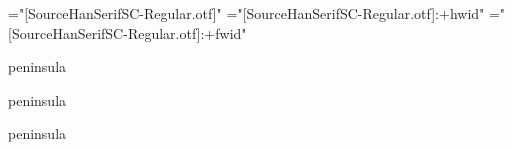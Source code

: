 \font\fa="[SourceHanSerifSC-Regular.otf]"
\font\fb="[SourceHanSerifSC-Regular.otf]:+hwid"
\font\fc="[SourceHanSerifSC-Regular.otf]:+fwid"

\def\sample{peninsula}

\fa\sample\par
\fb\sample\par
\fc\sample\par

\bye